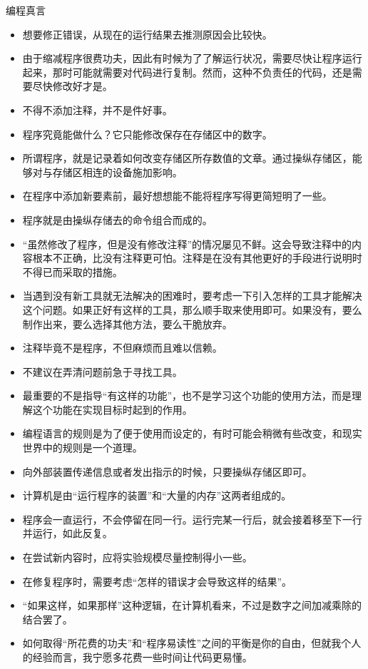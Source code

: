\begin{frame}
\begin{block}{编程真言}
\begin{itemize}
      \item 想要修正错误，从现在的运行结果去推测原因会比较快。
      \item 由于缩减程序很费功夫，因此有时候为了了解运行状况，需要尽快让程序运行起来，那时可能就需要对代码进行复制。然而，这种不负责任的代码，还是需要尽快修改好才是。
      \item 不得不添加注释，并不是件好事。
      \item 程序究竟能做什么？它只能修改保存在存储区中的数字。
      \item 所谓程序，就是记录着如何改变存储区所存数值的文章。通过操纵存储区，能够对与存储区相连的设备施加影响。
      \item 在程序中添加新要素前，最好想想能不能将程序写得更简短明了一些。
      \item 程序就是由操纵存储去的命令组合而成的。
      \item “虽然修改了程序，但是没有修改注释”的情况屡见不鲜。这会导致注释中的内容根本不正确，比没有注释更可怕。注释是在没有其他更好的手段进行说明时不得已而采取的措施。
      \item 当遇到没有新工具就无法解决的困难时，要考虑一下引入怎样的工具才能解决这个问题。如果正好有这样的工具，那么顺手取来使用即可。如果没有，要么制作出来，要么选择其他方法，要么干脆放弃。
      \item 注释毕竟不是程序，不但麻烦而且难以信赖。
      \item 不建议在弄清问题前急于寻找工具。
      \item 最重要的不是指导“有这样的功能”，也不是学习这个功能的使用方法，而是理解这个功能在实现目标时起到的作用。
      \item 编程语言的规则是为了便于使用而设定的，有时可能会稍微有些改变，和现实世界中的规则是一个道理。
      \item 向外部装置传递信息或者发出指示的时候，只要操纵存储区即可。
      \item 计算机是由“运行程序的装置”和“大量的内存”这两者组成的。
      \item 程序会一直运行，不会停留在同一行。运行完某一行后，就会接着移至下一行并运行，如此反复。
      \item 在尝试新内容时，应将实验规模尽量控制得小一些。
      \item 在修复程序时，需要考虑“怎样的错误才会导致这样的结果”。
      \item “如果这样，如果那样”这种逻辑，在计算机看来，不过是数字之间加减乘除的结合罢了。
      \item 如何取得“所花费的功夫”和“程序易读性”之间的平衡是你的自由，但就我个人的经验而言，我宁愿多花费一些时间让代码更易懂。

\end{itemize}
\end{block}
\end{frame}
